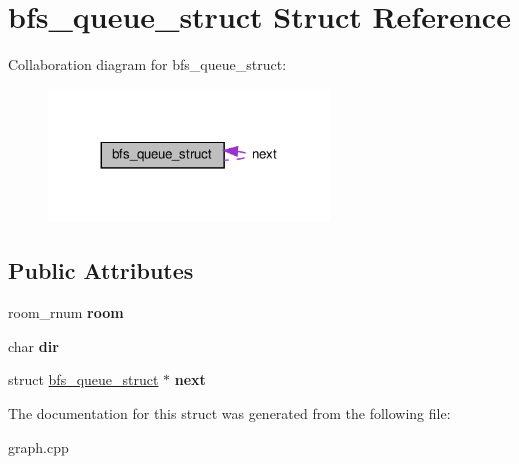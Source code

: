\hypertarget{structbfs__queue__struct}{}\section{bfs\+\_\+queue\+\_\+struct Struct Reference}
\label{structbfs__queue__struct}


Collaboration diagram for bfs\+\_\+queue\+\_\+struct\+:\nopagebreak
\begin{figure}[H]
\begin{center}
\leavevmode
\includegraphics[width=212pt]{structbfs__queue__struct__coll__graph}
\end{center}
\end{figure}
\subsection*{Public Attributes}
\begin{DoxyCompactItemize}
\item 
\mbox{\label{structbfs__queue__struct_ab8e2b9e326bc534284444c6a05fea88a}} 
room\+\_\+rnum {\bfseries room}
\item 
\mbox{\label{structbfs__queue__struct_a1b4779043921027a162a4679d60a470c}} 
char {\bfseries dir}
\item 
\mbox{\label{structbfs__queue__struct_a59db314a224e075250cb76a491d4ee8c}} 
struct \hyperlink{structbfs__queue__struct}{bfs\+\_\+queue\+\_\+struct} $\ast$ {\bfseries next}
\end{DoxyCompactItemize}


The documentation for this struct was generated from the following file\+:\begin{DoxyCompactItemize}
\item 
graph.\+cpp\end{DoxyCompactItemize}
